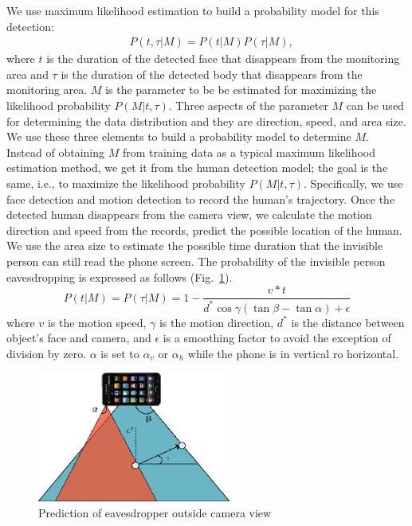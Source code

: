 We use maximum likelihood estimation to build a probability model for this detection:
\begin{equation}
\begin{split}
& P(t,\tau|M)=P(t|M)P(\tau|M),
\end{split}
\end{equation}
where $t$ is the duration of the detected face that disappears from the monitoring area and $\tau$ is the duration of the detected  body that disappears from the monitoring area. $M$ is the parameter to be be estimated for maximizing the likelihood probability $P(M|t,\tau)$. Three aspects of the parameter $M$ can be used for determining the data distribution and they are direction, speed, and area size. %
We use these three elements to build a probability model to determine $M$.  Instead of obtaining $M$ from training data as a typical maximum likelihood estimation method, we get it from the human detection model;  the goal is the same, i.e., to maximize the likelihood probability $P(M|t,\tau)$.  Specifically, we use face detection and motion detection  to record the human's trajectory. Once the detected human  disappears from the camera view, we calculate the motion direction and speed from the records, predict the possible location of the human. We use the area size  to estimate the possible time duration that the invisible person can still  read the phone screen. The probability of the invisible person eavesdropping is expressed as follows (Fig.~\ref{fig:invisible}).
\begin{equation}
P(t|M)=P(\tau|M)=1-\frac{v*t}{d^*\cos\gamma(\tan\beta-\tan\alpha)+\epsilon}
\label{eqn:prob}
\end{equation}
where $v$ is the motion speed, $\gamma$ is the motion direction,  $d^*$ is the distance between object's face and camera, and  $\epsilon$ is a smoothing factor to avoid the exception of division by zero. $\alpha$ is set to $\alpha_v$ or $\alpha_h$ while the phone is in vertical ro horizontal.
\begin{figure}[H]
\centering
\includegraphics[width=2.5in]{areaMotion.eps}
\caption{Prediction of eavesdropper outside camera view}
\label{fig:invisible}
\end{figure}




